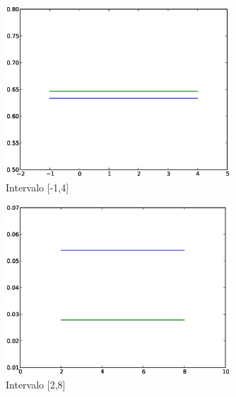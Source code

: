 \documentclass{beamer}
\begin{document}
\begin{frame}
 \begin{figure}[!th]
\begin{center}
\includegraphics[width=0.75\textwidth]{2intervalo.eps}
\caption{Intervalo [-1,4]}
\label{fig:2}
\end{center}
\end{figure}
\end{frame}
\begin{frame}
 \begin{figure}[!th]
\begin{center}
\includegraphics[width=0.75\textwidth]{3intervalo.eps}
\caption{Intervalo [2,8]}
\label{fig:3}
\end{center}
\end{figure}
\end{frame}




\end{document}
